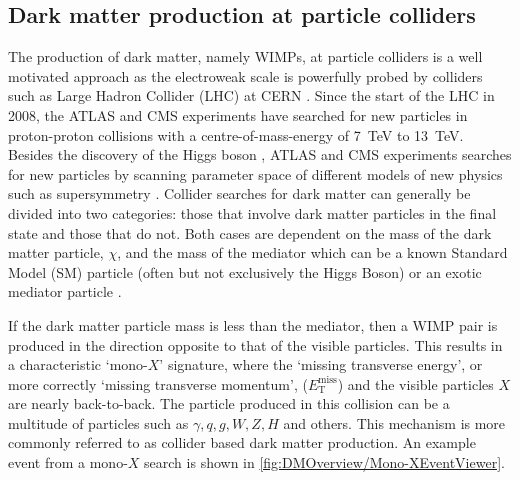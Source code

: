 \subsection{Dark matter production at particle colliders}\label{sec:DMOverview/DMProdColliders}
The production of dark matter, namely WIMPs, at particle colliders is a well motivated approach as the electroweak scale is powerfully probed by colliders such as Large Hadron Collider (LHC) at CERN \cite{Evans:2008zzb}. Since the start of the LHC in 2008, the ATLAS \cite{ATLAS:2008xda} and CMS \cite{CMS:2008xjf} experiments have searched for new particles in proton-proton collisions with a centre-of-mass-energy of 7~TeV to 13~TeV. Besides the discovery of the Higgs boson \cite{ATLAS:2012yve,CMS:2012qbp}, ATLAS and CMS experiments searches for new particles by scanning parameter space of different models of new physics such as supersymmetry \cite{hteagle:thesis}.
Collider searches for dark matter can generally be divided into two categories: those that involve dark matter particles in the final state and those that do not. Both cases are dependent on the mass of the dark matter particle, $\chi$, and the mass of the mediator which can be a known Standard Model (SM) particle (often but not exclusively the Higgs Boson) or an exotic mediator particle \cite{Penning:2017tmb}. 

If the dark matter particle mass is less than the mediator, then a WIMP pair is produced in the direction opposite to that of the visible particles. This results in a characteristic `mono-$X$' signature, where the `missing transverse energy', or more correctly `missing transverse momentum', ($E^{\text{miss}}_\text{T}$) and the visible particles $X$ are nearly back-to-back. The particle produced in this collision can be a multitude of particles such as $\gamma, q, g, W, Z, H$ and others. This mechanism is more commonly referred to as collider based dark matter production. An example event from a mono-$X$ search is shown in \autoref{fig:DMOverview/Mono-XEventViewer}.

